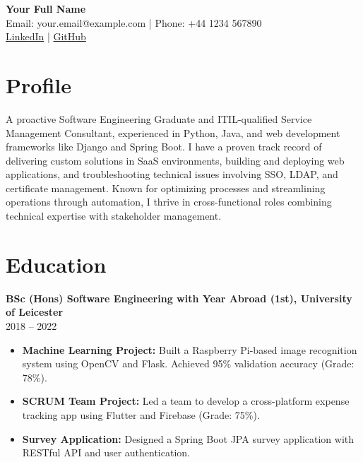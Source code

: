 \documentclass[a4paper,10pt]{article}
\begin{document}
\begin{center}
    {\LARGE \textbf{Your Full Name}} \\
    \vspace{0.1cm}
    Email: your.email@example.com | Phone: +44 1234 567890 \\
    \href{https://linkedin.com/in/yourprofile}{LinkedIn} | \href{https://github.com/yourgithub}{GitHub} \\
\end{center}

\vspace{0.5cm}

\section*{Profile}
A proactive Software Engineering Graduate and ITIL-qualified Service Management Consultant, experienced in Python, Java, and web development frameworks like Django and Spring Boot. I have a proven track record of delivering custom solutions in SaaS environments, building and deploying web applications, and troubleshooting technical issues involving SSO, LDAP, and certificate management. Known for optimizing processes and streamlining operations through automation, I thrive in cross-functional roles combining technical expertise with stakeholder management.

\vspace{0.3cm}

\section*{Education}
\textbf{BSc (Hons) Software Engineering with Year Abroad (1st), University of Leicester} \\
2018 -- 2022 \\
\begin{itemize}[left=0.15cm]
    \item \textbf{Machine Learning Project:} Built a Raspberry Pi-based image recognition system using OpenCV and Flask. Achieved 95\% validation accuracy (Grade: 78\%).
    \item \textbf{SCRUM Team Project:} Led a team to develop a cross-platform expense tracking app using Flutter and Firebase (Grade: 75\%).
    \item \textbf{Survey Application:} Designed a Spring Boot JPA survey application with RESTful API and user authentication.
\end{itemize}
\end{document}
